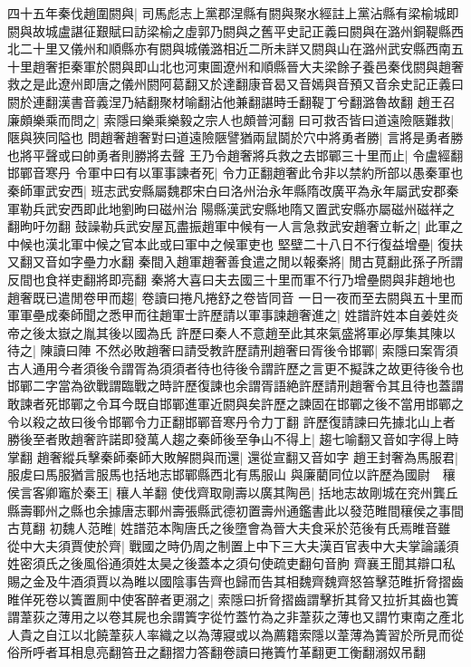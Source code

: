 四十五年秦伐趙圍閼與|{
	司馬彪志上黨郡涅縣有閼與聚水經註上黨沾縣有梁榆城即閼與故城盧諶征艱賦曰訪梁榆之虛郭乃閼與之舊平史記正義曰閼與在潞州銅鞮縣西北二十里又儀州和順縣亦有閼與城儀潞相近二所未詳又閼與山在潞州武安縣西南五十里趙奢拒秦軍於閼與即山北也河東圖遼州和順縣晉大夫梁餘子養邑秦伐閼與趙奢救之是此遼州即唐之儀州閼阿葛翻又於達翻康音曷又音嫣與音預又音余史記正義曰閼於連翻漢書音義涅乃結翻聚材喻翻沾他兼翻諶時壬翻鞮丁兮翻潞魯故翻}
趙王召廉頗樂乘而問之|{
	索隱曰樂乘樂毅之宗人也頗普河翻}
曰可救否皆曰道遠險陿難救|{
	陿與狹同隘也}
問趙奢趙奢對曰道遠險陿譬猶兩鼠鬬於穴中將勇者勝|{
	言將是勇者勝也將平聲或曰帥勇者則勝將去聲}
王乃令趙奢將兵救之去邯鄲三十里而止|{
	令盧經翻邯鄲音寒丹}
令軍中曰有以軍事諫者死|{
	令力正翻趙奢此令非以禁約所部以愚秦軍也}
秦師軍武安西|{
	班志武安縣屬魏郡宋白曰洛州治永年縣隋改廣平為永年屬武安郡秦軍勒兵武安西即此地劉昫曰磁州治陽縣漢武安縣地隋又置武安縣亦屬磁州磁祥之翻昫吁勿翻}
鼓譟勒兵武安屋瓦盡振趙軍中候有一人言急救武安趙奢立斬之|{
	此軍之中候也漢北軍中候之官本此或曰軍中之候軍吏也}
堅壁二十八日不行復益增壘|{
	復扶又翻又音如字壘力水翻}
秦間入趙軍趙奢善食遣之閒以報秦將|{
	閒古莧翻此孫子所謂反間也食祥吏翻將即亮翻}
秦將大喜曰夫去國三十里而軍不行乃增壘閼與非趙地也趙奢既已遣閒卷甲而趨|{
	卷讀曰捲凡捲舒之卷皆同音}
一日一夜而至去閼與五十里而軍軍壘成秦師聞之悉甲而往趙軍士許歷請以軍事諫趙奢進之|{
	姓譜許姓本自姜姓炎帝之後太嶽之胤其後以國為氏}
許歷曰秦人不意趙至此其來氣盛將軍必厚集其陳以待之|{
	陳讀曰陣}
不然必敗趙奢曰請受教許歷請刑趙奢曰胥後令邯鄲|{
	索隱曰案胥須古人通用今者須後令謂胥為須須者待也待後令謂許歷之言更不擬誅之故更待後令也邯鄲二字當為欲戰謂臨戰之時許歷復諫也余謂胥語絶許歷請刑趙奢令其且待也蓋謂敢諫者死邯鄲之令耳今既自邯鄲進軍近閼與矣許歷之諫固在邯鄲之後不當用邯鄲之令以殺之故曰後令邯鄲令力正翻邯鄲音寒丹令力丁翻}
許歷復請諫曰先據北山上者勝後至者敗趙奢許諾即發萬人趨之秦師後至争山不得上|{
	趨七喻翻又音如字得上時掌翻}
趙奢縱兵擊秦師秦師大敗解閼與而還|{
	還從宣翻又音如字}
趙王封奢為馬服君|{
	服䖍曰馬服猶言服馬也括地志邯鄲縣西北有馬服山}
與廉藺同位以許歷為國尉　穰侯言客卿竈於秦王|{
	穰人羊翻}
使伐齊取剛壽以廣其陶邑|{
	括地志故剛城在兖州龔丘縣壽鄆州之縣也余據唐志鄆州壽張縣武德初置壽州通鑑書此以發范睢間穰侯之事間古莧翻}
初魏人范睢|{
	姓譜范本陶唐氏之後墮會為晉大夫食采於范後有氏焉睢音雖}
從中大夫須賈使於齊|{
	戰國之時仍周之制置上中下三大夫漢百官表中大夫掌論議須姓密須氏之後風俗通須姓太昊之後蓋本之須句使疏吏翻句音朐}
齊襄王聞其辯口私賜之金及牛酒須賈以為睢以國陰事告齊也歸而告其相魏齊魏齊怒笞擊范睢折脅摺齒睢佯死卷以簀置厠中使客醉者更溺之|{
	索隱曰折脅摺齒謂擊折其脅又拉折其齒也簀謂葦荻之薄用之以卷其屍也余謂簀字從竹蓋竹為之非葦荻之薄也又謂竹東南之產北人貴之自江以北饒葦荻人率織之以為薄寢或以為薦籍索隱以葦薄為簀習於所見而從俗所呼者耳相息亮翻笞丑之翻摺力答翻卷讀曰捲簀竹革翻更工衡翻溺奴吊翻}
